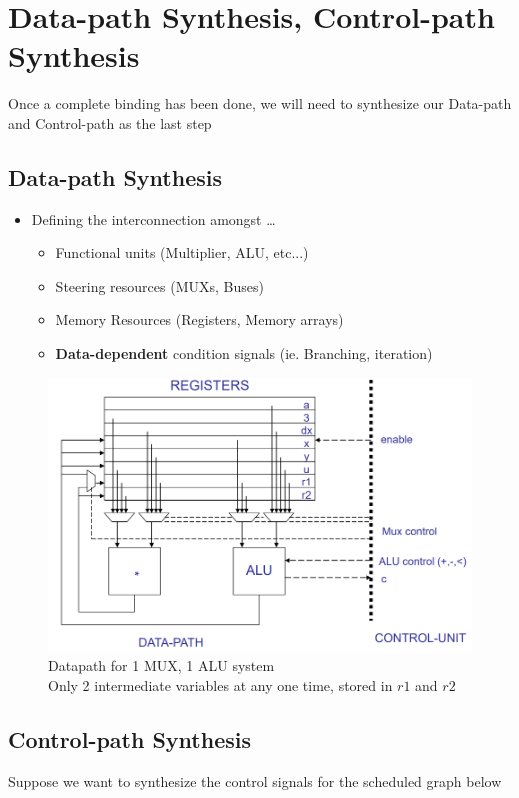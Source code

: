 \documentclass{article}
\begin{document}
\section{Data-path Synthesis, Control-path Synthesis}
Once a complete binding has been done, we will need to synthesize our Data-path and Control-path as the last step

\subsection{Data-path Synthesis}
\begin{itemize}
    \item Defining the interconnection amongst \dots
        \begin{itemize}
            \item Functional units (Multiplier, ALU, etc...)
            \item Steering resources (MUXs, Buses)
            \item Memory Resources (Registers, Memory arrays)
            \item \textbf{Data-dependent} condition signals (ie. Branching, iteration)
        \end{itemize}
\end{itemize}

\begin{figure}[htp]
    \centering
    \includegraphics[width=14cm, scale=1]{S3/dataPathSynthesis.PNG}
    \caption{Datapath for 1 MUX, 1 ALU system\\
                Only 2 intermediate variables at any one time, stored in $r1$ and $r2$}
\end{figure}

\subsection{Control-path Synthesis}
Suppose we want to synthesize the control signals for the scheduled graph below
\end{document}

